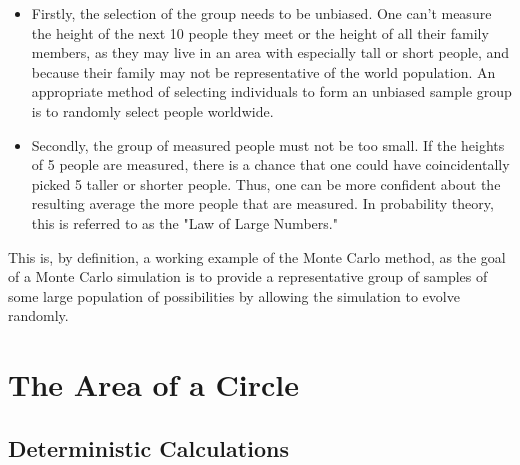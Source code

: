 \documentclass[11pt]{article}
\begin{document}
\begin{itemize}
  \item Firstly, the selection of the group needs to be unbiased. One can't measure the height of the next 10 people they meet or the height of all their family members, as they may live in an area with especially tall or short people, and because their family may not be representative of the world population. An appropriate method of selecting individuals to form an unbiased sample group is to randomly select people worldwide.

  \item Secondly, the group of measured people must not be too small. If the heights of 5 people are measured, there is a chance that one could have coincidentally picked 5 taller or shorter people. Thus, one can be more confident about the resulting average the more people that are measured. In probability theory, this is referred to as the "Law of Large Numbers."
\end{itemize}

This is, by definition, a working example of the Monte Carlo method, as the goal of a Monte Carlo simulation is to provide a representative group of samples of some large population of possibilities by allowing the simulation to evolve randomly. 

\section{The Area of a Circle}
\subsection{Deterministic Calculations}
\end{document}
